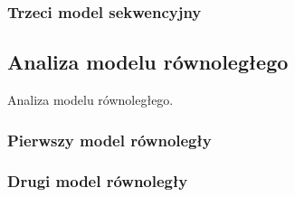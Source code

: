 \subsubsection{Trzeci model sekwencyjny}

\subsection{Analiza modelu równoległego}

Analiza modelu równoległego.

\subsubsection{Pierwszy model równoległy}

\subsubsection{Drugi model równoległy}

